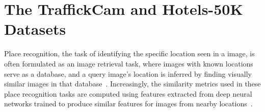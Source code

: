 
\chapter{The TraffickCam and Hotels-50K Datasets}
\label{ch:3}

Place recognition, the task of identifying the specific location seen in a image, is often formulated as an image retrieval task, where images with known locations serve as a database, and a query image's location is inferred by finding visually similar images in that database~\cite{baatz2012large,chen2011city,crandall2009mapping,hays2008im2gps,jacobs07geolocate,schindler2007city,torii2013visual,zamir2010accurate,googleLandmarks}. Increasingly, the similarity metrics used in these place recognition tasks are computed using features extracted from deep neural networks trained to produce similar features for images from nearby locations~\cite{zhou2014recognizing,netvlad,visualPlaceRecognition,vo2017revisit,zhai2018geotemporal}.

